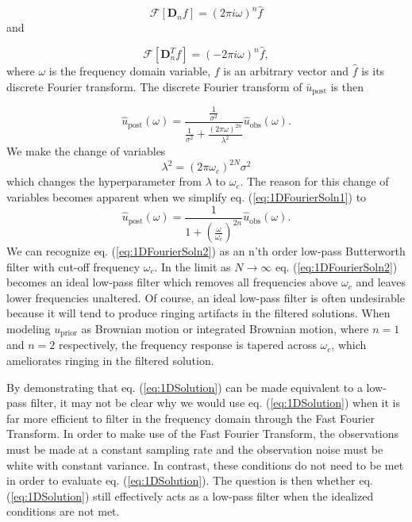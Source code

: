 \documentclass[10pt,a4paper]{article}
\begin{document}
\begin{equation}\label{eq:Property1}
  \mathcal{F}[\mathbf{D}_nf] = (2\pi i\omega)^n \hat{f}
\end{equation}
and

\begin{equation}\label{eq:Property2}
  \mathcal{F}[\mathbf{D}^T_nf] = (-2\pi i\omega)^n \hat{f},
\end{equation}
where $\omega$ is the frequency domain variable, $f$ is an arbitrary vector and $\hat{f}$ is its discrete Fourier transform.  The discrete Fourier transform of $\bar{u}_\mathrm{post}$ is then

\begin{equation}\label{eq:1DFourierSoln1}
\hat{u}_\mathrm{post}(\omega) = \frac{\frac{1}{\sigma^2}}
                                  {\frac{1}{\sigma^2} +                  
                                  \frac{(2\pi\omega)^{2n}}{\lambda^2}}
                                  \hat{u}_\mathrm{obs}(\omega).
\end{equation}
We make the change of variables 
\begin{equation}\label{eq:VariableChange}
\lambda^2 = (2\pi\omega_c)^{2N}\sigma^2
\end{equation}
which changes the hyperparameter from $\lambda$ to $\omega_c$.  The reason for this change of variables becomes apparent when we simplify eq. (\ref{eq:1DFourierSoln1}) to
\begin{equation}\label{eq:1DFourierSoln2}
\hat{u}_\mathrm{post}(\omega) = \frac{1}
                                  {1 + \left(\frac{\omega}{\omega_c}\right)^{2n}}
                                  \hat{u}_\mathrm{obs}(\omega).        
\end{equation}
We can recognize eq. (\ref{eq:1DFourierSoln2}) as an n'th order low-pass Butterworth filter with cut-off frequency $\omega_c$.  In the limit as $N\to \infty$ eq. (\ref{eq:1DFourierSoln2}) becomes an ideal low-pass filter which removes all frequencies above $\omega_c$ and leaves lower frequencies unaltered.  Of course, an ideal low-pass filter is often undesirable because it will tend to produce ringing artifacts in the filtered solutions.  When modeling $u_\mathrm{prior}$ as Brownian motion or integrated Brownian motion, where $n=1$ and $n=2$ respectively, the frequency response is tapered across $\omega_c$, which ameliorates ringing in the filtered solution.

By demonstrating that eq. (\ref{eq:1DSolution}) can be made equivalent to a low-pass filter, it may not be clear why we would use eq. (\ref{eq:1DSolution}) when it is far more efficient to filter in the frequency domain through the Fast Fourier Transform.  In order to make use of the Fast Fourier Transform, the observations must be made at a constant sampling rate and the observation noise must be  white with constant variance.  In contrast, these conditions do not need to be met in order to evaluate eq. (\ref{eq:1DSolution}).  The question is then whether eq. (\ref{eq:1DSolution}) still effectively acts as a low-pass filter when the idealized conditions are not met.  
\end{document}
